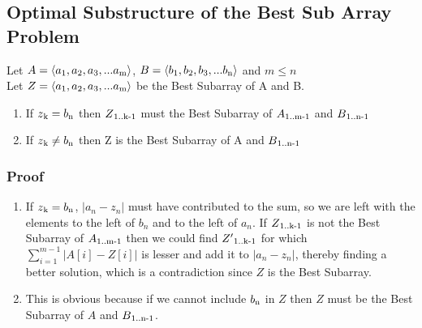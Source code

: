 \documentclass[12pt,letterpaper]{article}
\begin{document}
    \subsection*{Optimal Substructure of the Best Sub Array Problem}
        \begin{intro}
            Let $A = \langle a\textsubscript{1}, a\textsubscript{2}, a\textsubscript{3}, ... a\textsubscript{m} \rangle$,
            $B = \langle b\textsubscript{1}, b\textsubscript{2}, b\textsubscript{3}, ... b\textsubscript{n} \rangle$
            and $m \leq n$ \\
            Let $Z = \langle a\textsubscript{1}, a\textsubscript{2}, a\textsubscript{3}, ... a\textsubscript{m} \rangle$ be the Best Subarray of A and B.
        \end{intro}
        \begin{enumerate}
            \item If $z\textsubscript{k} = b\textsubscript{n}$ then $Z\textsubscript{1..k-1}$ must the Best Subarray of $A\textsubscript{1..m-1}$ and $B\textsubscript{1..n-1}$
            \item If $z\textsubscript{k} \neq b\textsubscript{n}$ then Z is the Best Subarray of A and $B\textsubscript{1..n-1}$
        \end{enumerate}

        \subsubsection*{Proof}

        \begingroup
            \fontsize{10pt}{12pt}\selectfont

            \begin{enumerate}
                \item If $z\textsubscript{k} = b\textsubscript{n}$, $\big | a_n - z_n \big |$ must have contributed to the sum, so we are left with the elements to the left of $b_n$ and to the left of $a_n$. If $Z\textsubscript{1..k-1}$ is not the Best Subarray of $A\textsubscript{1..m-1}$ then we could find $Z'\textsubscript{1..k-1}$ for which $\sum\limits_{i=1}^{m-1} \big|A[i]-Z[i]\big|$ is lesser and add it to $\big | a_n - z_n \big |$, thereby finding a better solution, which is a contradiction since $Z$ is the Best Subarray.

                \item This is obvious because if we cannot include $b\textsubscript{n}$ in $Z$ then $Z$ must be the Best Subarray of $A$ and $B\textsubscript{1..n-1}$.\\
            \end{enumerate}
\end{document}
